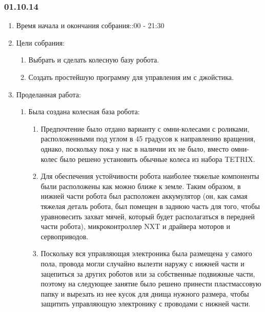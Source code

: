 
\subsubsection{01.10.14}

\begin{enumerate}
	\item Время начала и окончания собрания::00 - 21:30
	\item Цели собрания:\newline
	\begin{enumerate}
		\item Выбрать и сделать колесную базу робота.\newline
		
		\item Создать простейшую программу для управления им с джойстика.\newline
		
	\end{enumerate}
	
	\item Проделанная работа:\newline
	\begin{enumerate}
		\item Была создана колесная база робота:\newline
		\begin{enumerate}
			\item Предпочтение было отдано варианту с омни-колесами с роликами, расположенными под углом в 45 градусов к направлению вращения, однако, поскольку пока у нас в наличии их не было, вместо омни-колес было решено установить обычные колеса из набора TETRIX.\newline
			
			\item Для обеспечения устойчивости робота наиболее тяжелые компоненты были расположены как можно ближе к земле. Таким образом, в нижней части робота был расположен аккумулятор (он, как самая тяжелая деталь робота, был помещен в заднюю часть для того, чтобы уравновесить захват мячей, который будет располагаться в передней части робота), микроконтроллер NXT и драйвера моторов и сервоприводов.\newline
			
			\item Поскольку вся управляющая электроника была размещена у самого пола, провода могли случайно вылезти наружу с нижней части и зацепиться за других роботов или за собственные подвижные части, поэтому на следующее занятие было решено принести пластмассовую папку и вырезать из нее кусок для днища нужного размера, чтобы защитить управляющую электронику с проводами с нижней части.\newline
			

\end{enumerate}
\end{enumerate}
\end{enumerate}
